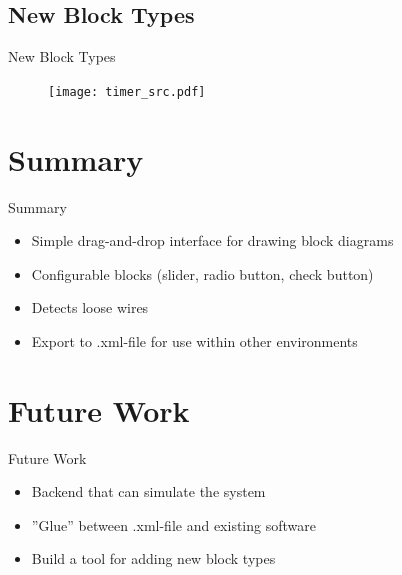\documentclass{beamer}
\begin{document}
\subsection*{New Block Types}
\begin{frame}{New Block Types}
    \begin{figure}
        \texttt{[image: timer\_src.pdf]}
        \label{fig:timer_src}
    \end{figure}
\end{frame}

\section{Summary}
\begin{frame}{Summary}
	\begin{itemize}
		\item<2->  Simple drag-and-drop interface for drawing block diagrams
        \item<3->  Configurable blocks (slider, radio button, check button)
		\item<4->  Detects loose wires
        \item<5->  Export to .xml-file for use within other environments
	\end{itemize}
\end{frame}

\section{Future Work}
\begin{frame}{Future Work}
	\begin{itemize}
		\item<2-> Backend that can simulate the system
		\item<3-> ''Glue'' between .xml-file and existing software
		\item<4-> Build a tool for adding new block types
	\end{itemize}
\end{frame}
\end{document}
